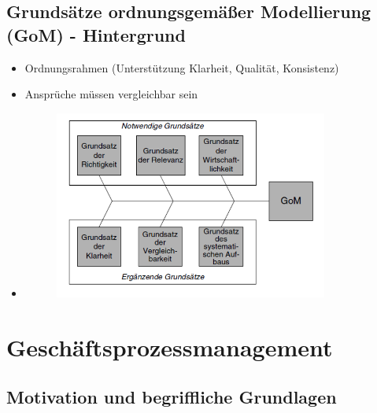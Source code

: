 \documentclass[11pt,a4paper]{article}
\begin{document}
\subsection{Grundsätze ordnungsgemäßer Modellierung (GoM) - Hintergrund}
\begin{itemize}
	
	\item Ordnungsrahmen (Unterstützung Klarheit, Qualität, Konsistenz)
	\item Ansprüche müssen vergleichbar sein
	\item[] 
	\begin{figure}[H]
	\centering
	\includegraphics[width=9cm]{Bilder/gom}
	\end{figure}	
	
	
\end{itemize}

\section{Geschäftsprozessmanagement}
\subsection{Motivation und begriffliche Grundlagen}
\end{document}
